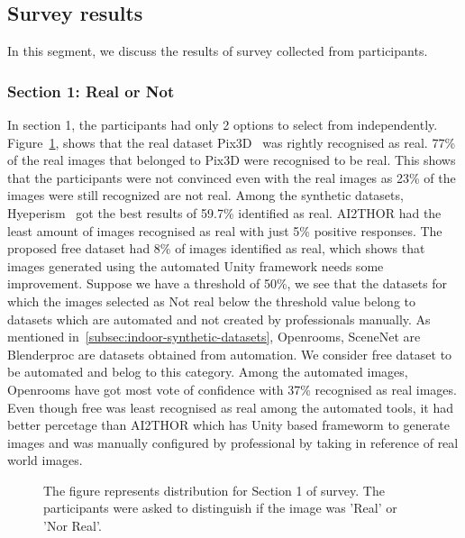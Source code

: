\subsection{Survey results}\label{subsec:survey-results}
In this segment, we discuss the results of survey collected from participants.

\subsubsection{Section 1: Real or Not}
In section 1, the participants had only 2 options to select from independently.
Figure~\ref{fig:question1}, shows that the real dataset Pix3D~\cite{pix3d} was rightly recognised as real.
77\% of the real images that belonged to Pix3D were recognised to be real.
This shows that the participants were not convinced even with the real images as 23\% of the images were still recognized are not real.
Among the synthetic datasets, Hyeperism~\cite{Roberts2020HypersimAP} got the best results of 59.7\% identified as real.
AI2THOR had the least amount of images recognised as real with just 5\% positive responses.
The proposed \gls{free} dataset had 8\% of images identified as real, which shows that images generated using the automated Unity framework needs some improvement.
Suppose we have a threshold of 50\%, we see that the datasets for which the images selected as Not real below the threshold value belong to datasets which are automated and not created by professionals manually.
As mentioned in~\ref{subsec:indoor-synthetic-datasets}, Openrooms, SceneNet are Blenderproc are datasets obtained from automation.
We consider \gls{free} dataset to be automated and belog to this category.
Among the automated images, Openrooms have got most vote of confidence with 37\% recognised as real images.
Even though \gls{free} was least recognised as real among the automated tools, it had better percetage than AI2THOR which has Unity based frameworm to generate images and was manually configured by professional by taking in reference of real world images.

\begin{figure}
    \centering
    \resizebox{\textwidth}{!}{}
    \caption{The figure represents distribution for Section 1 of survey. The participants were asked to distinguish if the image was 'Real' or 'Nor Real'.}
    \label{fig:question1}
\end{figure}

